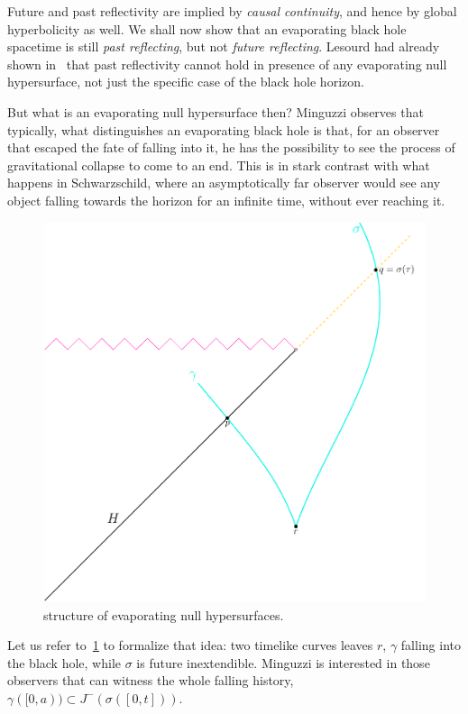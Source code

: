 	Future and past reflectivity are implied by \emph{causal continuity}, and hence by global hyperbolicity as well. We shall now show that an evaporating black hole spacetime is still \emph{past reflecting}, but not \emph{future reflecting}. Lesourd had already shown in~\cite[]{lesourd2018causal} that past reflectivity cannot hold in presence of any evaporating null hypersurface, not just the specific case of the black hole horizon. 

	But what is an evaporating null hypersurface then? Minguzzi observes that typically, what distinguishes an evaporating black hole is that, for an observer that escaped the fate of falling into it, he has the possibility to see the process of gravitational collapse to come to an end. This is in stark contrast with what happens in Schwarzschild, where an asymptotically far observer would see any object falling towards the horizon for an infinite time, without ever reaching it.

	\begin{figure}
		\centering
		\includegraphics[scale=0.5]{Immagini/evaporating-surfaces/evaporating-surfaces.pdf}
		\caption{structure of evaporating null hypersurfaces.}
		\label{fig:evaporating-surface}
	\end{figure}

	Let us refer to~\ref{fig:evaporating-surface} to formalize that idea: two timelike curves leaves \(r\), \(\gamma\) falling into the black hole, while \(\sigma\) is future inextendible. Minguzzi is interested in those observers that can witness the whole falling history, \(\gamma ([0,a)) \subset J^-(\sigma([0,t]))\).

